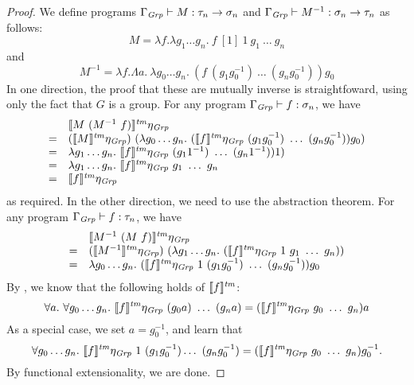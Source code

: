 \begin{proof}
  We define programs $\Gamma_{\mathit{Grp}} \vdash M : \tau_n \to \sigma_n$ and
  $\Gamma_{\mathit{Grp}} \vdash M^{-1} : \sigma_n \to \tau_n$ as follows:
  \begin{displaymath}
    M = \lambda f. \lambda g_1 \dots g_n.\ f\ [1]\ 1\ g_1\ \dots\ g_n
  \end{displaymath}
  and
  \begin{displaymath}
    M^{-1} = \lambda f. \Lambda a.\ \lambda g_0 \dots g_n.\ (f\ (g_1 g^{-1}_0)\ \dots\ (g_n g^{-1}_0)) g_0
  \end{displaymath}
  In one direction, the proof that these are mutually inverse is
  straightfoward, using only the fact that $G$ is a group. For any
  program $\Gamma_{\mathit{Grp}} \vdash f : \sigma_n$, we have
  \begin{displaymath}
    \begin{array}{cl}
        & \tmSem{M\ (M^{-1}\ f)}\eta_\Grp \\
      = & (\tmSem{M}\eta_{\Grp})\ (\lambda g_0 \dots g_n.\ (\tmSem{f}\eta_\Grp\ (g_1 g^{-1}_0)\ \dots\ (g_n g^{-1}_0)) g_0) \\
      = & \lambda g_1\dots g_n.\ \tmSem{f}\eta_\Grp\ (g_1 1^{-1})\ \dots\ (g_n 1^{-1})) 1) \\
      = & \lambda g_1\dots g_n.\ \tmSem{f}\eta_\Grp\ g_1\ \dots\ g_n \\
      = & \tmSem{f}\eta_\Grp
    \end{array}
  \end{displaymath}
  as required. In the other direction, we need to use the abstraction
  theorem. For any program $\Gamma_{\mathit{Grp}} \vdash f : \tau_n$, we have
  \begin{displaymath}
    \begin{array}{cl}
        & \tmSem{M^{-1}\ (M\ f)}\eta_\Grp \\
      = & (\tmSem{M^{-1}}\eta_\Grp)\ (\lambda g_1\dots g_n.\ (\tmSem{f}\eta_\Grp\ 1\ g_1\ \dots\ g_n)) \\
      = & \lambda g_0\dots g_n.\ (\tmSem{f}\eta_\Grp\ 1\ (g_1g^{-1}_0)\ \dots\ (g_ng^{-1}_0))g_0
    \end{array}
  \end{displaymath}
  By , we know that the following holds of
  $\llbracket f \rrbracket^{\mathit{tm}}$:
  \begin{displaymath}
    \forall a.\ \forall g_0 \dots g_n.\ \tmSem{f}\eta_\Grp\ (g_0a)\ \dots\ (g_na) = (\tmSem{f}\eta_\Grp\ g_0\ \dots\ g_n)a
  \end{displaymath}
  As a special case, we set $a = g^{-1}_0$, and learn that
  \begin{displaymath}
    \forall g_0 \dots g_n.\ \tmSem{f}\eta_\Grp\ 1\ (g_1g^{-1}_0) \dots\ (g_ng^{-1}_0) = (\tmSem{f}\eta_\Grp\ g_0\ \dots\ g_n)g^{-1}_0.
  \end{displaymath}
  By functional extensionality, we are done.
\end{proof}

